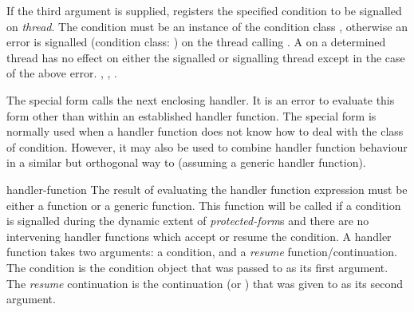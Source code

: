 \begin{optDefinition}
If the third argument is supplied,  registers the specified
condition to be signalled on {\em thread}.  The condition must be an instance of
the condition class , otherwise an error is
signalled (condition class:
) on
the thread calling .  A  on a determined
thread has no effect on either the signalled or signalling thread except in the
case of the above error.
%
\seealso%
, , .

%
\Syntax
\label{call-next-handler-syntax}
%
%
\remarks%
The  special form calls the next enclosing
handler. It is an error to evaluate this form other than within an established
handler function. The  special form is normally
used when a handler function does not know how to deal with the class of
condition. However, it may also be used to combine handler function behaviour in
a similar but orthogonal way to  (assuming a
generic handler function).

%
\Syntax
\label{with-handler-syntax}
%
%
\begin{arguments}
    \item[handler-function] The result of evaluating the handler function
    expression must be either a function or a generic function.  This function
    will be called if a condition is signalled during the dynamic extent of {\em
        protected-form}s and there are no intervening handler functions which
    accept or resume the condition.  A handler function takes two arguments: a
    condition, and a {\em resume} function/continuation.  The condition is the
    condition object that was passed to  as its first
    argument.  The {\em resume} continuation is the continuation (or \nil{}) that
    was given to  as its second argument.


\end{arguments}
\end{optDefinition}
